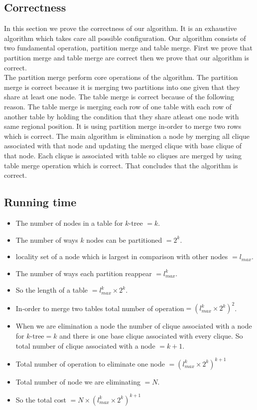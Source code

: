 \documentclass[12pt]{article}
\begin{document}
\subsection{Correctness}
In this section we prove the correctness of our algorithm. It is an exhaustive algorithm which takes care all possible configuration.
Our algorithm consists of two fundamental operation, partition merge and table merge. First we prove that partition merge and table merge are correct then we prove that our algorithm is correct.\\
 The partition merge perform core operations of the algorithm. The partition merge is correct because it is merging two partitions into one given that they share at least one node. The table merge is correct because of the following reason. The table merge is merging each row of one table with each row of another table by holding the condition that they share atleast one node with same regional position. It is using partition merge in-order to merge two rows which is correct. The main algorithm is elimination a node by merging all clique associated with that node and updating the merged clique with base clique of that node. Each clique is associated with table so cliques are merged by using table merge operation which is correct. That concludes that the algorithm is correct.
\subsection{Running time}
\begin{itemize}[noitemsep]
\item The number of nodes in a table for $k$-tree $=k$.
\item The number of ways $k$ nodes can be partitioned $=2^k$.
\item locality set of a node which is largest in comparison with other nodes $=l_{max}$.
\item The number of ways each partition reappear $=l_{max}^k$.
\item So the length of a table $=l_{max}^k \times 2^k$.
\item In-order to merge two tables total number of operation$=(l_{max}^k \times 2^k)^2$.
\item When we are elimination a node the number of clique associated with a node for $k$-tree$=k$ and there is one base clique associated with every clique. So total number of clique associated with a node $=k+1$.
\item Total number of operation to eliminate one node $=(l_{max}^k \times 2^k)^{k+1}$
\item Total number of node we are eliminating $=N$.
\item So the total cost $=N \times( l_{max}^k \times 2^k)^{k+1}$
\
\end{itemize}
\end{document}
